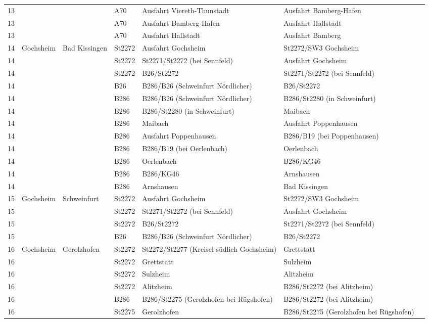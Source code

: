 \begin{tabular}{|l|l|l|l|l|l|l|}
    13 &  &  & A70 & Ausfahrt Viereth-Thunstadt & Ausfahrt Bamberg-Hafen\\ 
    13 &  &  & A70 & Ausfahrt Bamberg-Hafen & Ausfahrt Hallstadt\\ 
    13 &  &  & A70 & Ausfahrt Hallstadt & Ausfahrt Bamberg\\ 
    \hline
    14 & Gochsheim & Bad Kissingen & St2272 & Ausfahrt Gochsheim & St2272/SW3 Gochsheim\\ 
    14 &  &  & St2272 & St2271/St2272 (bei Sennfeld) & Ausfahrt Gochsheim\\ 
    14 &  &  & St2272 & B26/St2272 & St2271/St2272 (bei Sennfeld)\\ 
    14 &  &  & B26 & B286/B26 (Schweinfurt Nördlicher) & B26/St2272\\ 
    14 &  &  & B286 & B286/B26 (Schweinfurt Nördlicher) & B286/St2280 (in Schweinfurt)\\ 
    14 &  &  & B286 & B286/St2280 (in Schweinfurt) & Maibach\\ 
    14 &  &  & B286 & Maibach & Ausfahrt Poppenhausen\\ 
    14 &  &  & B286 & Ausfahrt Poppenhausen & B286/B19 (bei Poppenhausen)\\ 
    14 &  &  & B286 & B286/B19 (bei Oerlenbach) & Oerlenbach\\ 
    14 &  &  & B286 & Oerlenbach & B286/KG46\\ 
    14 &  &  & B286 & B286/KG46 & Arnshausen\\ 
    14 &  &  & B286 & Arnshausen & Bad Kissingen\\ 
    \hline
    15 & Gochsheim & Schweinfurt & St2272 & Ausfahrt Gochsheim & St2272/SW3 Gochsheim\\ 
    15 &  &  & St2272 & St2271/St2272 (bei Sennfeld) & Ausfahrt Gochsheim\\ 
    15 &  &  & St2272 & B26/St2272 & St2271/St2272 (bei Sennfeld)\\ 
    15 &  &  & B26 & B286/B26 (Schweinfurt Nördlicher) & B26/St2272\\ 
    \hline
    16 & Gochsheim & Gerolzhofen & St2272 & St2272/St2277 (Kreisel südlich Gochsheim) & Grettstatt\\ 
    16 &  &  & St2272 & Grettstatt & Sulzheim\\ 
    16 &  &  & St2272 & Sulzheim & Alitzheim\\ 
    16 &  &  & St2272 & Alitzheim & B286/St2272 (bei Alitzheim)\\ 
    16 &  &  & B286 & B286/St2275 (Gerolzhofen bei Rügshofen) & B286/St2272 (bei Alitzheim)\\ 
    16 &  &  & St2275 & Gerolzhofen & B286/St2275 (Gerolzhofen bei Rügshofen)\\ 
    \hline
\end{tabular}
